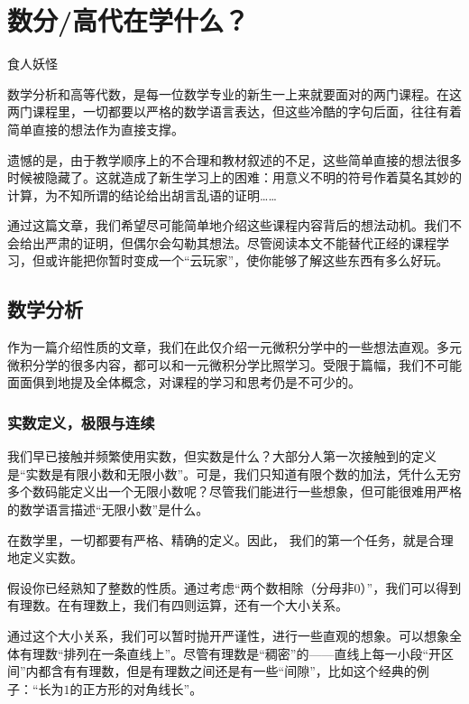 \chapter[数分/高代在学什么？]{数分/高代在学什么？}\label{cp:数分/高代在学什么？}


\begin{center}
    \itshapeCJK\normalsize 食人妖怪
\end{center}


数学分析和高等代数，是每一位数学专业的新生一上来就要面对的两门课程。在这两门课程里，一切都要以严格的数学语言表达，但这些冷酷的字句后面，往往有着简单直接的想法作为直接支撑。

遗憾的是，由于教学顺序上的不合理和教材叙述的不足，这些简单直接的想法很多时候被隐藏了。这就造成了新生学习上的困难：用意义不明的符号作着莫名其妙的计算，为不知所谓的结论给出胡言乱语的证明……

通过这篇文章，我们希望尽可能简单地介绍这些课程内容背后的想法动机。我们不会给出严肃的证明，但偶尔会勾勒其想法。尽管阅读本文不能替代正经的课程学习，但或许能把你暂时变成一个“云玩家”，使你能够了解这些东西有多么好玩。
\section{数学分析}

作为一篇介绍性质的文章，我们在此仅介绍一元微积分学中的一些想法直观。多元微积分学的很多内容，都可以和一元微积分学比照学习。受限于篇幅，我们不可能面面俱到地提及全体概念，对课程的学习和思考仍是不可少的。
\subsection{实数定义，极限与连续}

我们早已接触并频繁使用实数，但实数是什么？大部分人第一次接触到的定义是“实数是有限小数和无限小数”。可是，我们只知道有限个数的加法，凭什么无穷多个数码能定义出一个无限小数呢？尽管我们能进行一些想象，但可能很难用严格的数学语言描述“无限小数”是什么。

在数学里，一切都要有严格、精确的定义。因此，
我们的第一个任务，就是合理地定义实数。

假设你已经熟知了整数的性质。通过考虑“两个数相除（分母非$0$）”，我们可以得到有理数。在有理数上，我们有四则运算，还有一个大小关系。

通过这个大小关系，我们可以暂时抛开严谨性，进行一些直观的想象。可以想象全体有理数“排列在一条直线上”。尽管有理数是“稠密”的——直线上每一小段“开区间”内都含有有理数，但是有理数之间还是有一些“间隙”，比如这个经典的例子：“长为$1$的正方形的对角线长”。

